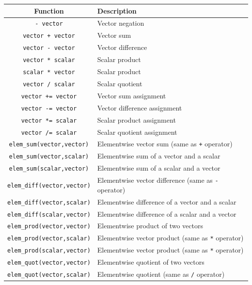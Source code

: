 \begin{table}[t!]\begin{centering}
\begin{tabular}{|c|l|} \hline
Function & Description \\ \hline \hline
\verb#- vector# & Vector negation \\ \hline
\verb#vector + vector# & Vector sum \\ \hline
\verb#vector - vector# & Vector difference \\ \hline
\verb#vector * scalar# & Scalar product \\ \hline
\verb#scalar * vector# & Scalar product \\ \hline
\verb#vector / scalar# & Scalar quotient \\ \hline
\verb#vector += vector# & Vector sum assignment \\ \hline
\verb#vector -= vector# & Vector difference assignment \\ \hline
\verb#vector *= scalar# & Scalar product assignment \\ \hline
\verb#vector /= scalar# & Scalar quotient assignment \\ \hline
\hline
\verb#elem_sum(vector,vector)# & Elementwise vector sum (same as \verb#+# operator) \\ \hline
\verb#elem_sum(vector,scalar)# & Elementwise sum of a vector and a scalar \\ \hline
\verb#elem_sum(scalar,vector)# & Elementwise sum of a scalar and a vector \\ \hline
\verb#elem_diff(vector,vector)# & Elementwise vector difference (same as \verb#-# operator) \\ \hline
\verb#elem_diff(vector,scalar)# & Elementwise difference of a vector and a scalar \\ \hline
\verb#elem_diff(scalar,vector)# & Elementwise difference of a scalar and a vector \\ \hline
\verb#elem_prod(vector,vector)# & Elementwise product of two vectors \\ \hline
\verb#elem_prod(vector,scalar)# & Elementwise vector product (same as \verb#*# operator) \\ \hline
\verb#elem_prod(scalar,vector)# & Elementwise vector product (same as \verb#*# operator) \\ \hline
\verb#elem_quot(vector,vector)# & Elementwise quotient of two vectors \\ \hline
\verb#elem_quot(vector,scalar)# & Elementwise quotient (same as \verb#/# operator) \\ \hline

\end{tabular}
\end{centering}
\end{table}
